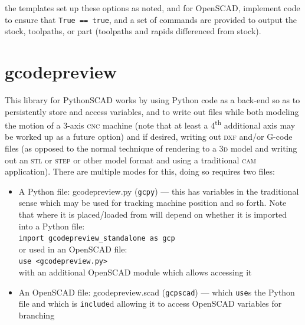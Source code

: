 \documentclass{ltxdoc}
\begin{document}

\noindent the templates set up these options as noted, and for OpenSCAD, implement code to ensure that \verb|True == true|, and a set of commands are provided to output the stock, toolpaths, or part (toolpaths and rapids differenced from stock).

\section{gcodepreview}

This library for PythonSCAD works by using Python code as a back-end so as to persistently store and access variables, and to write out files while both modeling the motion of a 3-axis \textsc{cnc} machine (note that at least a 4\textsuperscript{th} additional axis may be worked up as a future option) and if desired, writing out \textsc{dxf} and/or G-code files (as opposed to the normal technique of rendering to a \textsc{3d} model and writing out an \textsc{stl} or \textsc{step} or other model format and using a traditional \textsc{cam} application). There are multiple modes for this, doing so requires two files:

\begin{itemize}
\item A Python file: gcodepreview.py (\texttt{gcpy}) --- this has
      variables in the traditional sense which may be used for tracking machine position and so
      forth. 
      Note that where it is placed/loaded from will depend on whether it is imported into
      a Python file:\\
      \verb|import gcodepreview_standalone as gcp|\\ 
      or used in an OpenSCAD file:\\
      \verb|use <gcodepreview.py>|\\
      with an additional OpenSCAD module which allows accessing it
\item An OpenSCAD file: gcodepreview.scad (\texttt{gcpscad}) --- which \verb|use|s the Python file 
      and which is \texttt{include}d allowing it to access OpenSCAD variables for branching   
\end{itemize}
\end{document}
